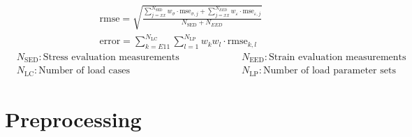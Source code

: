     \begin{center}
        \begin{gather}
            \label{eq: rmse}
             \text{rmse} = \sqrt{\frac{\displaystyle\sum_{j=xx}^{N_\text{SED}} w_{\sigma} \cdot \text{mse}_{\sigma,j} + \displaystyle\sum_{j=xx}^{N_{EED}} w_{\varepsilon} \cdot \text{mse}_{\varepsilon,j}}{N_\text{SED} + N_{\scriptscriptstyle EED}}} \\
             \label{eq: error}
            \text{error} = \sum_{k=E11}^{N_\text{LC}} \sum_{l=1}^{N_\text{LP}} w_k w_l \cdot \text{rmse}_{k,l}  
        \end{gather}
        \begin{equation*}
            \begin{split}
                &N_\text{SED}: \text{Stress evaluation measurements}\\
                &N_{\text{LC}}: \text{Number of load cases}
            \end{split}
            \hspace{2cm}
            \begin{split}
                &N_\text{EED}: \text{Strain evaluation measurements}\\
                &N_{\text{LP}}: \text{Number of load parameter sets}
            \end{split}
        \end{equation*}
    \end{center}
    
 
    
    \section{Preprocessing} \label{sec: preprocessing}


